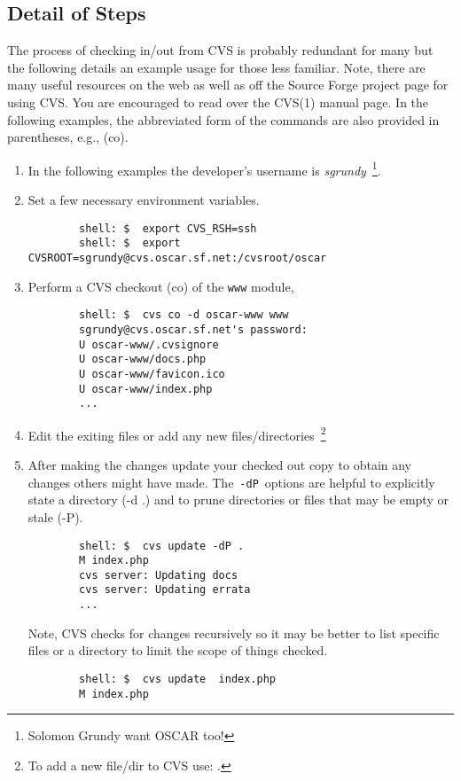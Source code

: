 
\subsection{Detail of Steps}

The process of checking in/out from CVS is probably redundant for many but
the following details an example usage for those less familiar.  Note, there
are many useful resources on the web as well as off the Source Forge
project page for using CVS.  You are encouraged to read over the CVS(1)
manual page.   In the following examples, the abbreviated form of the
 commands are also provided in parentheses, e.g., 
(co).

\begin{enumerate}
	\item In the following examples the developer's username is
	\emph{sgrundy}~\footnote{Solomon Grundy want OSCAR too!}.

	\item Set a few necessary environment variables.
	\begin{verbatim}
		shell: $  export CVS_RSH=ssh
		shell: $  export CVSROOT=sgrundy@cvs.oscar.sf.net:/cvsroot/oscar
	\end{verbatim}

	\item Perform a CVS checkout (co) of the {\tt www} module,
	\begin{verbatim}
		shell: $  cvs co -d oscar-www www
		sgrundy@cvs.oscar.sf.net's password: 
		U oscar-www/.cvsignore
		U oscar-www/docs.php
		U oscar-www/favicon.ico
		U oscar-www/index.php
		...
	\end{verbatim}

	\item Edit the exiting files or add any new
	files/directories~\footnote{To add a new file/dir to CVS use: .}

	\item After making the changes update your checked out copy to obtain
	any changes others might have made.  The~{\tt -dP}~options are helpful
	to explicitly state a directory (-d  .) and to prune directories or
	files that may be empty or stale (-P).
	\begin{verbatim}
		shell: $  cvs update -dP .
		M index.php
		cvs server: Updating docs
		cvs server: Updating errata
		...
	\end{verbatim}
	Note, CVS checks for changes recursively so it may be better to list
	specific files or a directory to limit the scope of things checked.  
	\begin{verbatim}
		shell: $  cvs update  index.php
		M index.php
	\end{verbatim}


\end{enumerate}
